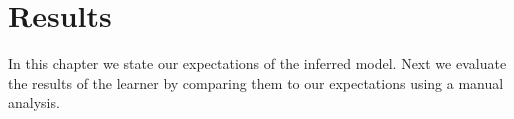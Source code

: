 \chapter{Results}

In this chapter we state our expectations of the inferred model. Next we evaluate the results of the learner by comparing them to our expectations using a manual analysis.




